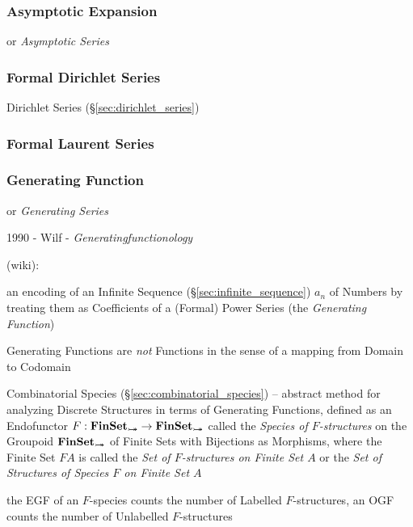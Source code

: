 \subsubsection{Asymptotic Expansion}\label{sec:asymptotic_expansion}

or \emph{Asymptotic Series}



\subsubsection{Formal Dirichlet Series}\label{sec:formal_dirichlet_series}

Dirichlet Series (\S\ref{sec:dirichlet_series})



\subsubsection{Formal Laurent Series}\label{sec:formal_laurent}

\subsubsection{Generating Function}\label{sec:generating_function}

or \emph{Generating Series}

1990 - Wilf - \emph{Generatingfunctionology}

(wiki):

an encoding of an Infinite Sequence (\S\ref{sec:infinite_sequence}) $a_n$ of
Numbers by treating them as Coefficients of a (Formal) Power Series (the
\emph{Generating Function})

Generating Functions are \emph{not} Functions in the sense of a mapping from
Domain to Codomain

\fist Combinatorial Species (\S\ref{sec:combinatorial_species}) -- abstract
method for analyzing Discrete Structures in terms of Generating Functions,
defined as an Endofunctor $F : \mathbf{FinSet}_{\rightarrowtail\hspace{-8pt}\twoheadrightarrow} \rightarrow
\mathbf{FinSet}_{\rightarrowtail\hspace{-8pt}\twoheadrightarrow}$ called the \emph{Species of $F$-structures} on the
Groupoid $\mathbf{FinSet}_{\rightarrowtail\hspace{-8pt}\twoheadrightarrow}$ of Finite Sets with Bijections as Morphisms,
where the Finite Set $F A$ is called the \emph{Set of $F$-structures on Finite
  Set $A$} or the \emph{Set of Structures of Species $F$ on Finite Set $A$}

the EGF of an $F$-species counts the number of Labelled $F$-structures, an OGF
counts the number of Unlabelled $F$-structures

